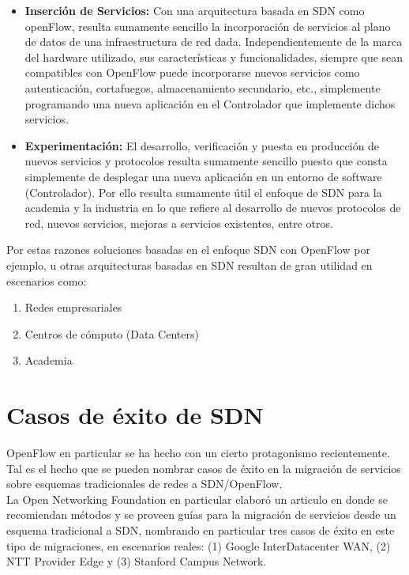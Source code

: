 \begin{itemize}
\item \textbf{Inserción de Servicios:}
Con una arquitectura basada en SDN como openFlow, resulta sumamente sencillo la incorporación de servicios al plano de datos de una infraestructura de red dada. Independientemente de la marca del hardware utilizado, sus características y funcionalidades, siempre que sean compatibles con OpenFlow puede incorporarse nuevos servicios como autenticación, cortafuegos, almacenamiento secundario, etc., simplemente programando una nueva aplicación en el Controlador que implemente dichos servicios.

\item \textbf{Experimentación:}
El desarrollo, verificación y puesta en producción de nuevos servicios y protocolos resulta sumamente sencillo puesto que consta simplemente de desplegar una nueva aplicación en un entorno de software 
 (Controlador). Por ello resulta sumamente útil el enfoque de SDN para la academia y la industria en lo que refiere al desarrollo de nuevos protocolos de red, nuevos servicios, mejoras a servicios existentes, entre otros.

\end{itemize}

Por estas razones soluciones basadas en el enfoque SDN con OpenFlow por ejemplo, u otras arquitecturas basadas en SDN resultan de gran utilidad en escenarios como:

\begin{enumerate}
\item Redes empresariales
\item Centros de cómputo (Data Centers)
\item Academia
\end{enumerate}

\section{Casos de éxito de SDN}
OpenFlow en particular se ha hecho con un cierto protagonismo recientemente. Tal es el hecho que se pueden nombrar casos de éxito en la migración de servicios sobre esquemas tradicionales de redes a SDN/OpenFlow.\\

La Open Networking Foundation en particular elabor\'o un articulo\cite{ONFSuccessCase} en donde se recomiendan métodos y se proveen guías para la migración de servicios desde un esquema tradicional a SDN, nombrando en particular tres casos de éxito en este tipo de migraciones, en escenarios reales: (1) Google InterDatacenter WAN, (2) NTT Provider Edge y (3) Stanford Campus Network.

